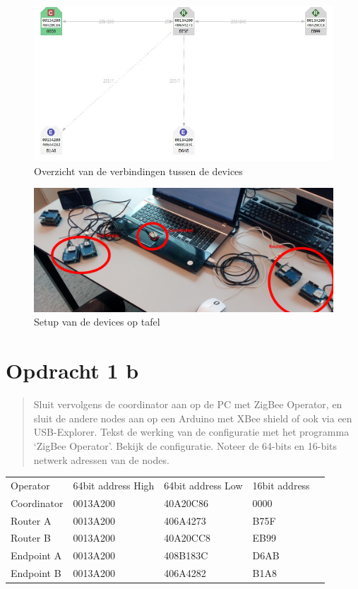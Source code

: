 \documentclass[12pt]{article}
\begin{document}
\clearpage
\begin{figure}[H]
\captionsetup{justification=raggedright,
singlelinecheck=false
}
\includegraphics[scale=0.8] {1a-drie}
\caption{Overzicht van de verbindingen tussen de devices}
\end{figure}
\begin{figure}[H]
\captionsetup{justification=raggedright,
singlelinecheck=false
}
\includegraphics[scale=0.1] {1a-twee}
\caption{Setup van de devices op tafel}
\end{figure}
\newpage
\section*{Opdracht 1 b}
\begin{quote}
Sluit vervolgens de coordinator aan op de PC met ZigBee Operator, en sluit de andere nodes 	aan 	op een Arduino met XBee shield of ook via een USB-Explorer. Tekst de werking van de configuratie met het programma ‘ZigBee Operator’. Bekijk de configuratie. Noteer de 64-bits en 16-bits netwerk adressen van de nodes.
\end{quote}
\begin{table}[h]
\begin{tabular}{|l|l|l|l|l}
\cline{1-4}
 Operator & 64bit address High & 64bit address Low & 16bit address &  \\ \cline{1-4}
 Coordinator & 0013A200 & 40A20C86  & 0000 \\ \cline{1-4}
 Router A & 0013A200 & 406A4273 & B75F &  \\ \cline{1-4}
 Router B & 0013A200 & 40A20CC8 & EB99 &  \\ \cline{1-4}
 Endpoint A & 0013A200 & 408B183C & D6AB &  \\ \cline{1-4}
 Endpoint B & 0013A200 & 406A4282 & B1A8 &  \\ \cline{1-4}
\end{tabular}
\end{table}
\newpage
\end{document}
